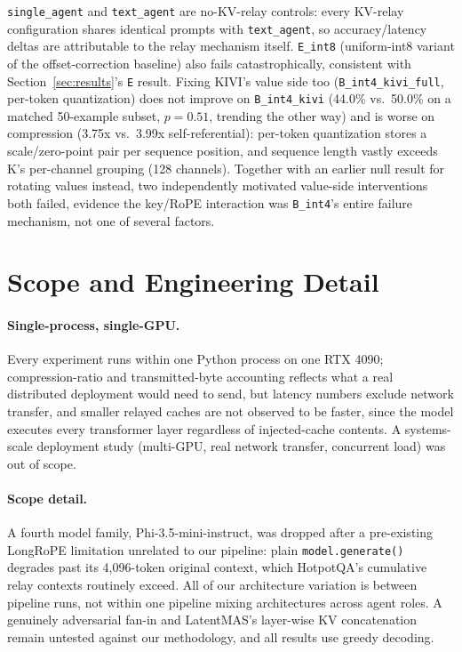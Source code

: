 \documentclass[11pt]{article}
\begin{document}
\texttt{single\_agent} and \texttt{text\_agent} are no-KV-relay
controls: every KV-relay configuration shares identical prompts with
\texttt{text\_agent}, so accuracy/latency deltas are attributable to
the relay mechanism itself. \texttt{E\_int8} (uniform-int8 variant of
the offset-correction baseline) also fails catastrophically, consistent
with Section~\ref{sec:results}'s \texttt{E} result. Fixing KIVI's value side
too (\texttt{B\_int4\_kivi\_full}, per-token quantization) does not
improve on \texttt{B\_int4\_kivi} (44.0\% vs.\ 50.0\% on a matched
50-example subset, $p=0.51$, trending the other way) and is worse on
compression (3.75x vs.\ 3.99x self-referential): per-token quantization
stores a scale/zero-point pair per sequence position, and sequence
length vastly exceeds K's per-channel grouping (128 channels). Together
with an earlier null result for rotating values instead, two
independently motivated value-side interventions both failed, evidence
the key/RoPE interaction was \texttt{B\_int4}'s entire failure
mechanism, not one of several factors.

\section{Scope and Engineering Detail}
\label{app:limitations}

\paragraph{Single-process, single-GPU.} Every experiment runs within
one Python process on one RTX 4090; compression-ratio and
transmitted-byte accounting reflects what a real distributed deployment
would need to send, but latency numbers exclude network transfer, and
smaller relayed caches are not observed to be faster, since the model
executes every transformer layer regardless of injected-cache contents.
A systems-scale deployment study (multi-GPU, real network transfer,
concurrent load) was out of scope.

\paragraph{Scope detail.} A fourth model family, Phi-3.5-mini-instruct, was dropped after a pre-existing LongRoPE limitation unrelated to our pipeline: plain \texttt{model.generate()} degrades past its 4{,}096-token original context, which HotpotQA's cumulative relay contexts routinely exceed. All of our architecture variation is between pipeline runs, not within one pipeline mixing architectures across agent roles. A genuinely adversarial fan-in \citep{latentagentslie2026} and LatentMAS's layer-wise KV concatenation \citep{latentmas2026} remain untested against our methodology, and all results use greedy decoding.
\end{document}
